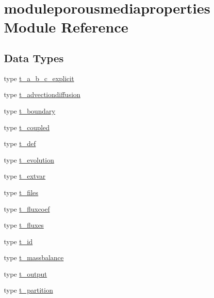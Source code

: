 \hypertarget{namespacemoduleporousmediaproperties}{}\section{moduleporousmediaproperties Module Reference}
\label{namespacemoduleporousmediaproperties}
\subsection*{Data Types}
\begin{DoxyCompactItemize}
\item 
type \mbox{\hyperlink{structmoduleporousmediaproperties_1_1t__a__b__c__explicit}{t\+\_\+a\+\_\+b\+\_\+c\+\_\+explicit}}
\item 
type \mbox{\hyperlink{structmoduleporousmediaproperties_1_1t__advectiondiffusion}{t\+\_\+advectiondiffusion}}
\item 
type \mbox{\hyperlink{structmoduleporousmediaproperties_1_1t__boundary}{t\+\_\+boundary}}
\item 
type \mbox{\hyperlink{structmoduleporousmediaproperties_1_1t__coupled}{t\+\_\+coupled}}
\item 
type \mbox{\hyperlink{structmoduleporousmediaproperties_1_1t__def}{t\+\_\+def}}
\item 
type \mbox{\hyperlink{structmoduleporousmediaproperties_1_1t__evolution}{t\+\_\+evolution}}
\item 
type \mbox{\hyperlink{structmoduleporousmediaproperties_1_1t__extvar}{t\+\_\+extvar}}
\item 
type \mbox{\hyperlink{structmoduleporousmediaproperties_1_1t__files}{t\+\_\+files}}
\item 
type \mbox{\hyperlink{structmoduleporousmediaproperties_1_1t__fluxcoef}{t\+\_\+fluxcoef}}
\item 
type \mbox{\hyperlink{structmoduleporousmediaproperties_1_1t__fluxes}{t\+\_\+fluxes}}
\item 
type \mbox{\hyperlink{structmoduleporousmediaproperties_1_1t__id}{t\+\_\+id}}
\item 
type \mbox{\hyperlink{structmoduleporousmediaproperties_1_1t__massbalance}{t\+\_\+massbalance}}
\item 
type \mbox{\hyperlink{structmoduleporousmediaproperties_1_1t__output}{t\+\_\+output}}
\item 
type \mbox{\hyperlink{structmoduleporousmediaproperties_1_1t__partition}{t\+\_\+partition}}
\item 

\end{DoxyCompactItemize}
